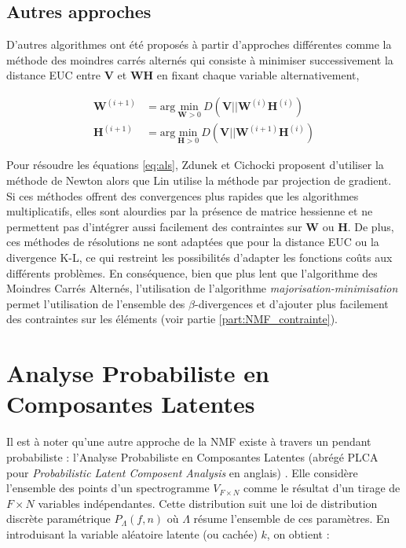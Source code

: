\subsection{Autres approches}

D'autres algorithmes ont été proposés à partir d'approches différentes comme la méthode des moindres carrés alternés \cite{cichocki_regularized_2007, berry_algorithms_2007} qui consiste à minimiser successivement la distance EUC entre $\mathbf{V}$ et $\mathbf{WH}$ en fixant chaque variable alternativement,

\begin{subequations}\label{eq:als}
\begin{align}
\mathbf{W}^{(i+1)} &= \text{arg}~\underset{\mathbf{W} > 0}{\text{min}}~D\left(\mathbf{V} \vert\vert\mathbf{W}^{(i)}\mathbf{H}^{(i)}\right)\\
\mathbf{H}^{(i+1)} &= \text{arg}~\underset{\mathbf{H} > 0}{\text{min}}~D\left(\mathbf{V} \vert\vert\mathbf{W}^{(i+1)}\mathbf{H}^{(i)}\right)
\end{align}
\end{subequations}

Pour résoudre les équations \ref{eq:als}, Zdunek et Cichocki \cite{zdunek2006non} proposent d'utiliser la méthode de Newton alors que Lin \cite{lin_projected_2007} utilise la méthode par projection de gradient. Si ces méthodes offrent des convergences plus rapides que les algorithmes multiplicatifs, elles sont alourdies par la présence de matrice hessienne et ne permettent pas d'intégrer aussi facilement des contraintes sur $\mathbf{W}$ ou $\mathbf{H}$. De plus, ces méthodes de résolutions ne sont adaptées que pour la distance EUC ou la divergence K-L, ce qui restreint les possibilités d'adapter les fonctions coûts aux différents problèmes. En conséquence, bien que plus lent que l'algorithme des Moindres Carrés Alternés, l'utilisation de l'algorithme \textit{majorisation-minimisation} permet l'utilisation de l'ensemble des $\beta$-divergences et d'ajouter plus facilement des contraintes sur les éléments (voir partie \ref{part:NMF_contrainte}).

\section{Analyse Probabiliste en Composantes Latentes}

Il est à noter qu'une autre approche de la NMF existe à travers un pendant probabiliste : l'Analyse Probabiliste en Composantes Latentes (abrégé PLCA pour \textit{Probabilistic Latent Composent Analysis} en anglais) \cite{hofmann_unsupervised_2001, cazau_understanding_2017}. Elle considère l'ensemble des points d'un spectrogramme $V_{F \times N}$ comme le résultat d'un tirage de $F \times N$ variables indépendantes.  Cette distribution suit une loi de distribution discrète paramétrique $P_{\Lambda}\left(f,n\right)$ où $\Lambda$ résume l'ensemble de ces paramètres. En introduisant la variable aléatoire latente (ou cachée) $k$, on obtient :

